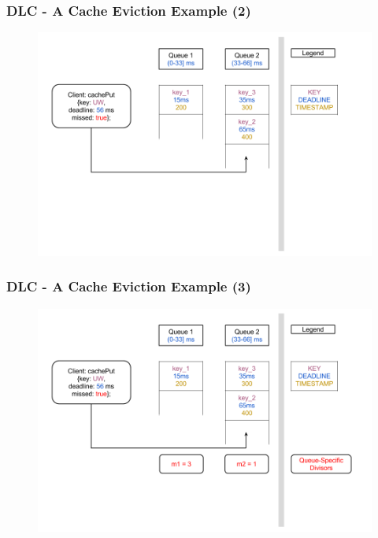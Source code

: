 \documentclass{beamer}
\begin{document}
\begin{frame}
  \frametitle{DLC - A Cache Eviction Example (2)}
  \begin{figure}
    \begin{center}
      \centerline{\includegraphics[scale=0.33]{img/DLC_V6_2.png}}
    \end{center}
  \end{figure}
\end{frame}

\begin{frame}
  \frametitle{DLC - A Cache Eviction Example (3)}
  \begin{figure}
    \begin{center}
      \centerline{\includegraphics[scale=0.33]{img/DLC_V6_3.png}}
    \end{center}
  \end{figure}
\end{frame}
\end{document}

